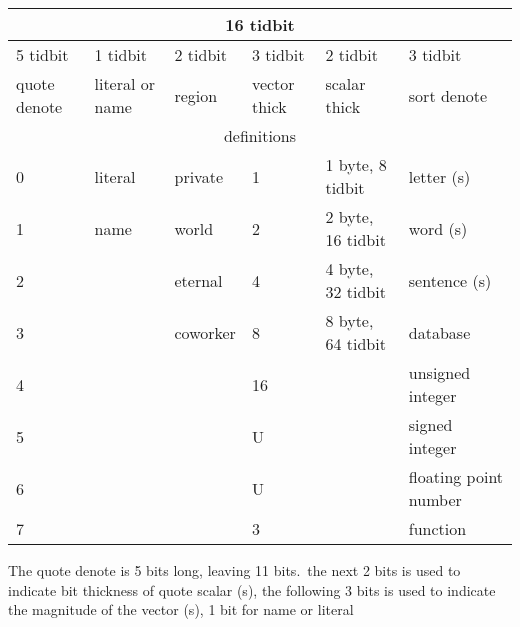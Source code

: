 \begin{tabular}{*{6}{l}}
\toprule
\multicolumn{6}{|c|}{16 tidbit}\\
\midrule
5 tidbit     & 1 tidbit & 2 tidbit            & 3 tidbit        & 2 tidbit & 3 tidbit \\
\midrule
quote denote & literal or name & region & vector thick & scalar thick & sort denote \\
\midrule
\midrule
\multicolumn{6}{|c|}{definitions}\\
\bottomrule
0            & literal& private  & 1  & 1 byte, 8 tidbit      & letter (s) \\
1            & name   & world    & 2 & 2 byte, 16 tidbit     & word (s) \\
2            &        & eternal  & 4 & 4 byte, 32 tidbit     & sentence (s) \\
3            &        & coworker & 8     & 8 byte, 64 tidbit     & database \\
4            &         & & 16                                  & & unsigned integer \\
5            &         & & U                                   & & signed integer \\
6            &         & & U                                   & & floating point number \\
7            &         & & 3                                   & & function \\
\bottomrule
\end{tabular}
The quote denote is 5 bits long, leaving 11 bits.\
the next 2 bits is used to indicate bit thickness of quote scalar (s),
the following 3 bits is used to indicate the magnitude of the vector (s),
1 bit for name or literal
%
